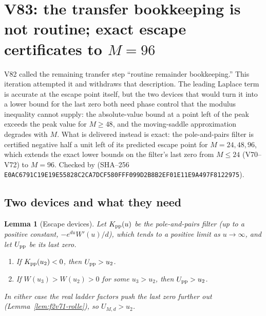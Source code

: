 \documentclass[11pt]{article}
\newtheorem{lemma}[theorem]{Lemma}
\theoremstyle{definition}
\theoremstyle{remark}
\begin{document}




\clearpage
\section{V83: the transfer bookkeeping is not routine; exact escape certificates to \texorpdfstring{$M=96$}{M=96}}
\label{sec:f2v83-bookkeeping}
\begingroup
\setcounter{equation}{0}
\renewcommand{\theequation}{N83.\arabic{equation}}
\renewcommand{\theHequation}{f2v83.\arabic{equation}}

V82 called the remaining transfer step ``routine remainder bookkeeping.''
This iteration attempted it and withdraws that description.  The
leading Laplace term is accurate at the escape point itself, but the
two devices that would turn it into a lower bound for the last zero both
need phase control that the modulus inequality cannot supply: the
absolute-value bound at a point left of the peak exceeds the peak value
for \(M\ge48\), and the moving-saddle approximation degrades with
\(M\).  What is delivered instead is exact: the pole-and-pairs filter is
certified negative half a unit left of its predicted escape point for
\(M=24,48,96\), which extends the exact lower bounds on the filter's
last zero from \(M\le24\) (V70--V72) to \(M=96\).  Checked by
 (SHA--256
\texttt{E0AC6791C19E19E55828C2CA7DCF580F}\allowbreak\texttt{FF099D2B8B2EF01E11E9A497F8122975}).

\subsection{Two devices and what they need}

\begin{lemma}[Escape devices]
\label{lem:f2v83-devices}
Let \(K_{\rm pp}(u)\) be the pole-and-pairs filter (up to a positive
constant, \(-e^{du}W'(u)/d\)), which tends to a positive limit as
\(u\to\infty\), and let \(U_{\rm pp}\) be its last zero.
\begin{enumerate}[label=\textup{(\roman*)}]
\item If \(K_{\rm pp}(u_2)<0\), then \(U_{\rm pp}>u_2\).
\item If \(W(u_3)>W(u_2)>0\) for some \(u_3>u_2\), then \(U_{\rm pp}>u_2\).
\end{enumerate}
In either case the real ladder factors push the last zero further out
(Lemma~\ref{lem:f2v71-rolle}), so \(U_{M,d}>u_2\).
\end{lemma}
\end{document}
